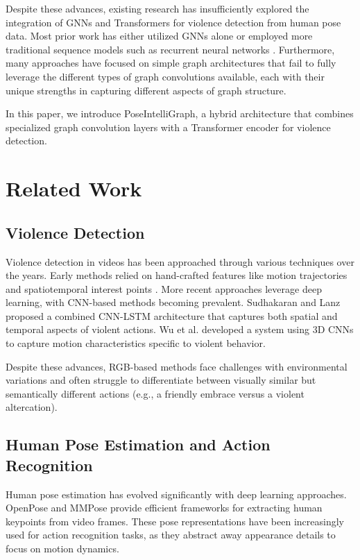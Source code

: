 \documentclass[conference]{IEEEtran}
\begin{document}
Despite these advances, existing research has insufficiently explored the integration of GNNs and Transformers for violence detection from human pose data. Most prior work has either utilized GNNs alone \cite{yan2018spatial} or employed more traditional sequence models such as recurrent neural networks \cite{li2019actional}. Furthermore, many approaches have focused on simple graph architectures that fail to fully leverage the different types of graph convolutions available, each with their unique strengths in capturing different aspects of graph structure.

In this paper, we introduce PoseIntelliGraph, a hybrid architecture that combines specialized graph convolution layers with a Transformer encoder for violence detection.

\section{Related Work}
\subsection{Violence Detection}
Violence detection in videos has been approached through various techniques over the years. Early methods relied on hand-crafted features like motion trajectories and spatiotemporal interest points \cite{nievas2011violence}. More recent approaches leverage deep learning, with CNN-based methods becoming prevalent. Sudhakaran and Lanz \cite{sudhakaran2017learning} proposed a combined CNN-LSTM architecture that captures both spatial and temporal aspects of violent actions. Wu et al. \cite{wu2020not} developed a system using 3D CNNs to capture motion characteristics specific to violent behavior.

Despite these advances, RGB-based methods face challenges with environmental variations and often struggle to differentiate between visually similar but semantically different actions (e.g., a friendly embrace versus a violent altercation).

\subsection{Human Pose Estimation and Action Recognition}
Human pose estimation has evolved significantly with deep learning approaches. OpenPose \cite{cao2017realtime} and MMPose \cite{mmpose2020} provide efficient frameworks for extracting human keypoints from video frames. These pose representations have been increasingly used for action recognition tasks, as they abstract away appearance details to focus on motion dynamics.
\end{document}
